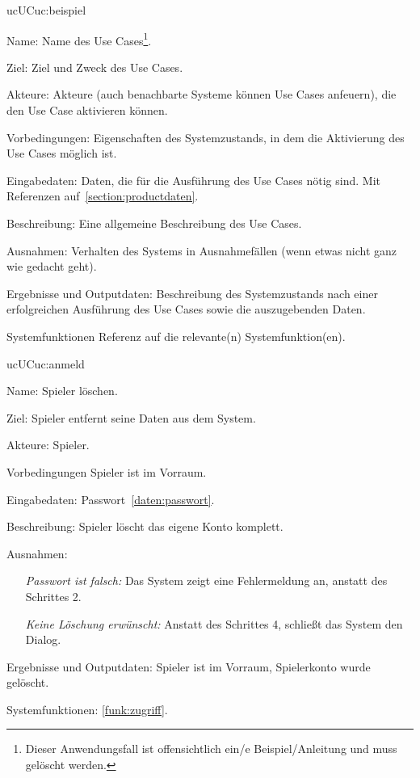 \begin{description}[leftmargin=5em, style=sameline]

	\begin{lhp}{uc}{UC}{uc:beispiel}
		\item [Name:] Name des Use Cases\footnote{Dieser Anwendungsfall ist offensichtlich ein/e Beispiel/Anleitung und muss gelöscht werden.}.
		\item [Ziel:] Ziel und Zweck des Use Cases.
		\item [Akteure:] Akteure (auch benachbarte Systeme können Use Cases anfeuern), die den Use Case aktivieren können.
		\item [Vorbedingungen:] Eigenschaften des Systemzustands, in dem die Aktivierung des Use Cases möglich ist.
		\item [Eingabedaten:] Daten, die für die Ausführung des Use Cases nötig sind. Mit Referenzen auf~\ref{section:productdaten}.
		\item [Beschreibung:] Eine allgemeine Beschreibung des Use Cases.
		\item [Ausnahmen:] Verhalten des Systems in Ausnahmefällen (wenn etwas nicht ganz wie gedacht geht).
		\item [Ergebnisse und Outputdaten:] Beschreibung des Systemzustands nach einer erfolgreichen Ausführung des Use Cases sowie die auszugebenden Daten.
		\item [Systemfunktionen] Referenz auf die relevante(n) Systemfunktion(en).
	\end{lhp}
	
	\begin{lhp}{uc}{UC}{uc:anmeld}
		\item [Name:] Spieler löschen.
		\item [Ziel:] Spieler entfernt seine Daten aus dem System.
		\item [Akteure:] Spieler.
		\item [Vorbedingungen] Spieler ist im Vorraum.
		\item [Eingabedaten:] Passwort~\ref{daten:passwort}.
		\item [Beschreibung:] Spieler löscht das eigene Konto komplett.
		\item [Ausnahmen:] \hfill
			\begin{itemize} 
				\item[] \textit{Passwort ist falsch:} Das System zeigt eine Fehlermeldung an, anstatt des Schrittes 2.
				\item[] \textit{Keine Löschung erwünscht:} Anstatt des Schrittes 4, schließt das System den Dialog.
				
			\end{itemize}
		\item [Ergebnisse und Outputdaten:] Spieler ist im Vorraum, Spielerkonto wurde gelöscht.	
		\item [Systemfunktionen:] \ref{funk:zugriff}.
	\end{lhp}


\end{description}